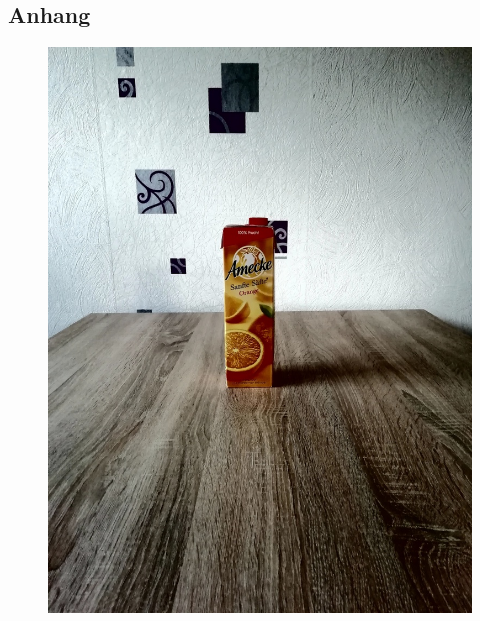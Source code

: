 
\begin{appendices}
\renewcommand{\appendixname}{ANHANG}
\renewcommand{\appendixtocname}{\appendixname} 
\addappheadtotoc 


\part*{Anhang}
\begin{figure}[htb]
\begin{minipage}[c]{0.2\textwidth}
\includegraphics[width=\textwidth]{Sources/Bild1_HA.jpg}
\end{minipage}
\hfill
\begin{minipage}[c]{0.08\textwidth}

\end{minipage}
\end{figure}
\end{appendices}

